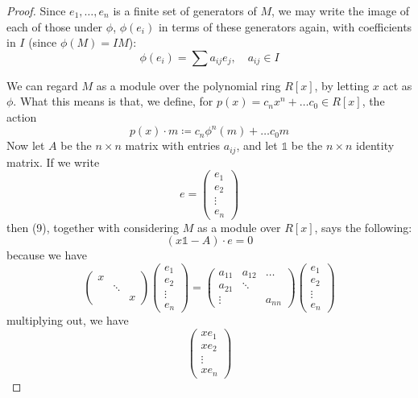 \documentclass[12pt]{article}
\theoremstyle{definition}
\begin{document}
\begin{proof}
Since $e_1,\dots ,e_n$ is a finite set of generators of $M$, we may write the image of each of those under $\phi$, $\phi(e_i)$ in terms of these generators again, with coefficients in $I$ (since $\phi(M) = IM$):
\begin{equation}
\phi(e_i) = \sum a_{ij} e_j, \quad a_{ij} \in I
\end{equation}

We can regard $M$ as a module over the polynomial ring $R[x]$, by letting $x$ act as $\phi$. What this means is that, we define, for $p(x) = c_nx^n+\dots c_0 \in R[x]$, the action
\[
p(x) \cdot m \coloneqq c_n\phi^n(m)+\dots c_0m
\]
Now let $A$ be the $n\times n$ matrix with entries $a_{ij}$, and let $\mathds{1}$ be the $n\times n$ identity matrix. If we write
\[
e =
\begin{pmatrix}
e_1\\
e_2\\
\vdots \\
e_n
\end{pmatrix}
\]
then (9), together with considering $M$ as a module over $R[x]$, says the following:
\begin{equation}
(x \mathds{1}-A) \cdot e =0    
\end{equation}
because we have
\[
\begin{pmatrix}
x & &\\
& \ddots &\\
& & x
\end{pmatrix}
\begin{pmatrix}
e_1\\
e_2\\
\vdots\\
e_n
\end{pmatrix}
=
\begin{pmatrix}
a_{11} & a_{12} &\dots\\
a_{21} & \ddots&\\
\vdots& & a_{nn}
\end{pmatrix}
\begin{pmatrix}
e_1\\
e_2\\
\vdots\\
e_n
\end{pmatrix}
\]
multiplying out,  we have
\[
\begin{pmatrix}
xe_1\\
xe_2\\
\vdots\\
xe_n
\end{pmatrix}
\]
\end{proof}
\end{document}
